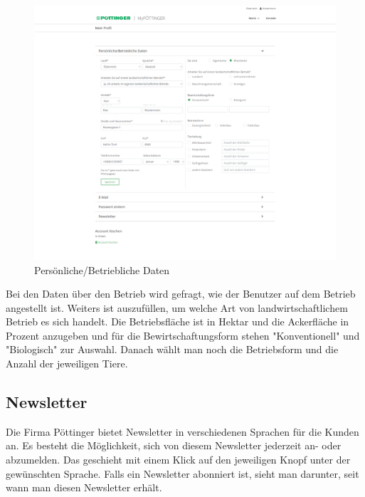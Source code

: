 \begin{figure}[H]
	\centerline{
		\includegraphics[width=1\textwidth, frame]{./grafiken/erm_profil_daten.png}
	}
	\vskip0pt
	\caption{Persönliche/Betriebliche Daten} \label{fig:profilData}
\end{figure}

Bei den Daten über den Betrieb wird gefragt, wie der Benutzer auf dem Betrieb angestellt ist. Weiters ist auszufüllen, um welche Art von landwirtschaftlichem Betrieb es sich handelt. Die Betriebsfläche ist in Hektar und die Ackerfläche in Prozent anzugeben und für die Bewirtschaftungsform stehen "Konventionell" und "Biologisch" zur Auswahl. Danach wählt man noch die Betriebsform und die Anzahl der jeweiligen Tiere.

\subsection{Newsletter}

Die Firma Pöttinger bietet Newsletter in verschiedenen Sprachen für die Kunden an. Es besteht die Möglichkeit, sich von diesem Newsletter jederzeit an- oder abzumelden. Das geschieht mit einem Klick auf den jeweiligen Knopf unter der gewünschten Sprache. Falls ein Newsletter abonniert ist, sieht man darunter, seit wann man diesen Newsletter erhält.

